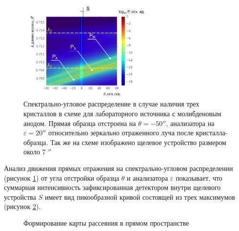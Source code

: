   \begin{figure}[H]
    \centering
    \includegraphics[width=0.6\textwidth]{images/triple_map.png}
    \caption{Спектрально-угловое распределение в случае наличия трех кристаллов в схеме для
    лабораторного источника с молибденовым анодом.
    Прямая образца отстроена на $\theta = - 50''$, анализатора на $\varepsilon = 20''$ относительно
    зеркально отраженного луча после кристалла-образца. Так же на схеме изображено щелевое устройство размером около 7 $''$}
    \label{ris:triple_map}
  \end{figure}

Анализ движения прямых отражения на спектрально-угловом распределении (рисунок \ref{ris:triple_map}) от угла отстройки образца $\theta$ и
анализатора $\varepsilon$ показывает, что суммарная интенсивность зафиксированная детектором внутри щелевого устройства
$S$ имеет вид пикообразной кривой состоящей из трех максимумов (рисунок \ref{ris:triple_map_piks}).

\begin{figure}[H]
  \centering
  \hfill
  \hfill
  \caption{Формирование карты рассеяния в прямом пространстве}
  \label{ris:triple_map_piks}
\end{figure}


